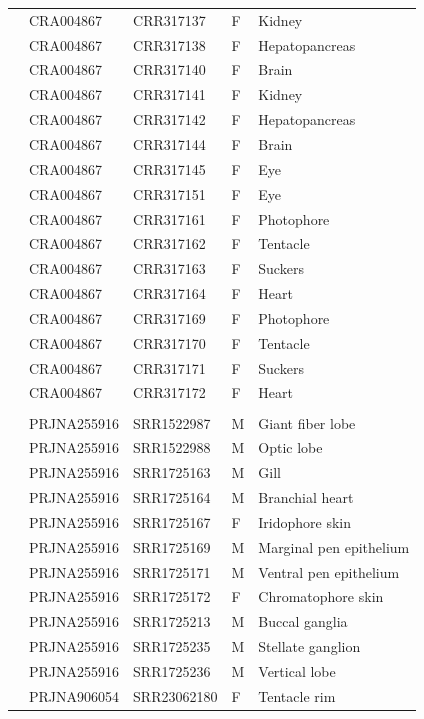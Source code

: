 \documentclass[12pt]{article}
\begin{document}
\begin{longtable}{lllll}
 & CRA004867 & CRR317137 & F & Kidney \\
 & CRA004867 & CRR317138 & F & Hepatopancreas \\
 & CRA004867 & CRR317140 & F & Brain \\
 & CRA004867 & CRR317141 & F & Kidney \\
 & CRA004867 & CRR317142 & F & Hepatopancreas \\
 & CRA004867 & CRR317144 & F & Brain \\
 & CRA004867 & CRR317145 & F & Eye \\
 & CRA004867 & CRR317151 & F & Eye \\
 & CRA004867 & CRR317161 & F & Photophore \\
 & CRA004867 & CRR317162 & F & Tentacle \\
 & CRA004867 & CRR317163 & F & Suckers \\
 & CRA004867 & CRR317164 & F & Heart \\
 & CRA004867 & CRR317169 & F & Photophore \\
 & CRA004867 & CRR317170 & F & Tentacle \\
 & CRA004867 & CRR317171 & F & Suckers \\
 & CRA004867 & CRR317172 & F & Heart \\
\addlinespace[4pt]
\multicolumn{5}{l}{\textit{Doryteuthis pealeii} (10F, 9M)} \\
\addlinespace[2pt]
 & PRJNA255916 & SRR1522987 & M & Giant fiber lobe \\
 & PRJNA255916 & SRR1522988 & M & Optic lobe \\
 & PRJNA255916 & SRR1725163 & M & Gill \\
 & PRJNA255916 & SRR1725164 & M & Branchial heart \\
 & PRJNA255916 & SRR1725167 & F & Iridophore skin \\
 & PRJNA255916 & SRR1725169 & M & Marginal pen epithelium \\
 & PRJNA255916 & SRR1725171 & M & Ventral pen epithelium \\
 & PRJNA255916 & SRR1725172 & F & Chromatophore skin \\
 & PRJNA255916 & SRR1725213 & M & Buccal ganglia \\
 & PRJNA255916 & SRR1725235 & M & Stellate ganglion \\
 & PRJNA255916 & SRR1725236 & M & Vertical lobe \\
 & PRJNA906054 & SRR23062180 & F & Tentacle rim \\

\end{longtable}
\end{document}
